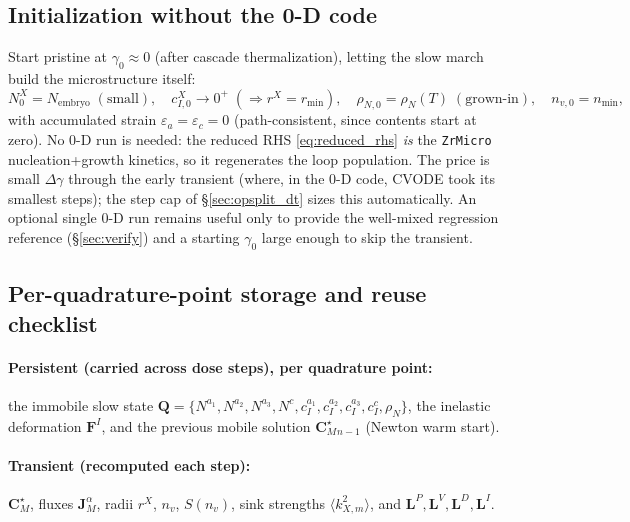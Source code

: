 \documentclass[11pt]{article}
\newcommand{\CM}{\mathbf{C}_{M}}
\newcommand{\eps}{\varepsilon}
\newcommand{\dg}{\Delta \gamma}
\newcommand{\ZrMicro}{\texttt{ZrMicro}}
\begin{document}
\subsection{Initialization without the 0-D code}
\label{sec:opsplit_init}

Start pristine at $\gamma_0\approx0$ (after cascade thermalization), letting the
slow march build the microstructure itself:
\begin{equation}
\label{eq:pristine}
    N^{X}_0 = N_{\mathrm{embryo}}\;(\text{small}),
    \quad
    c^{X}_{I,0}\to 0^{+}\;(\Rightarrow r^X=r_{\min}),
    \quad
    \rho_{N,0}=\rho_N(T)\;(\text{grown-in}),
    \quad
    n_{v,0}=n_{\min},
\end{equation}
with accumulated strain $\eps_a=\eps_c=0$ (path-consistent, since contents start
at zero). No 0-D run is needed: the reduced RHS \eqref{eq:reduced_rhs} \emph{is}
the \ZrMicro{} nucleation+growth kinetics, so it regenerates the loop population.
The price is small $\dg$ through the early transient (where, in the 0-D code,
CVODE took its smallest steps); the step cap of \S\ref{sec:opsplit_dt} sizes this
automatically. An optional single 0-D run remains useful only to provide the
well-mixed regression reference (\S\ref{sec:verify}) and a starting $\gamma_0$
large enough to skip the transient.

\subsection{Per-quadrature-point storage and reuse checklist}
\label{sec:opsplit_storage}

\paragraph{Persistent (carried across dose steps), per quadrature point:}
the immobile slow state $\mathbf Q=\{N^{a_1},N^{a_2},N^{a_3},N^{c},c^{a_1}_I,c^{a_2}_I,c^{a_3}_I,c^{c}_I,\rho_N\}$,
the inelastic deformation $\mathbf F^I$, and the previous mobile solution
$\CM^\star_{n-1}$ (Newton warm start).

\paragraph{Transient (recomputed each step):}
$\CM^\star$, fluxes $\mathbf J_M^\alpha$, radii $r^X$, $n_v$, $S(n_v)$, sink
strengths $\langle k^2_{X,m}\rangle$, and $\mathbf L^P,\mathbf L^V,\mathbf L^D,\mathbf L^I$.
\end{document}
